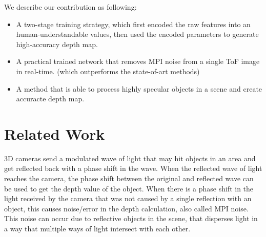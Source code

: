 \documentclass[a4paper, 11pt]{article}
\begin{document}
% 

% 
We describe our contribution as following: 
\begin{itemize}
    \item A two-stage training strategy, which first encoded the raw features into an human-understandable values, then used the encoded parameters to generate high-accuracy depth map.  
    \item A practical trained network that removes MPI noise from a single ToF image in real-time. (which outperforms the state-of-art methods)
    \item A method that is able to process highly specular objects in a scene and create accuracte depth map.
\end{itemize}



\section{Related Work}

3D cameras send a modulated wave of light that may hit objects in an area and get reflected back with a phase shift in the wave. 
When the reflected wave of light reaches the camera, the phase shift between the original and reflected wave can be used to get the depth value of the object. 
When there is a phase shift in the light received by the camera that was not caused by a single reflection with an object, this causes noise/error in the depth calculation, also called MPI noise. 
This noise can occur due to reflective objects in the scene, that disperses light in a way that multiple ways of light intersect with each other. 
\end{document}

